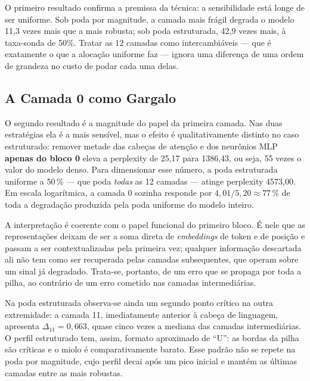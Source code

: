 \begin{figure}[htb]
\begin{tikzpicture}[scale=0.85]
\end{tikzpicture}
\end{figure}

O primeiro resultado confirma a premissa da técnica: a sensibilidade está longe de ser
uniforme. Sob poda por magnitude, a camada mais frágil degrada o modelo 11,3 vezes mais
que a mais robusta; sob poda estruturada, 42,9 vezes mais, à taxa-sonda de 50\%. Tratar as
12 camadas como intercambiáveis --- que é exatamente o que a alocação uniforme faz ---
ignora uma diferença de uma ordem de grandeza no custo de podar cada uma delas.

\subsection{A Camada 0 como Gargalo}\label{subsec:camada_zero}

O segundo resultado é a magnitude do papel da primeira camada. Nas duas
estratégias ela é a mais sensível, mas o efeito é qualitativamente distinto no
caso estruturado: remover metade das cabeças de atenção e dos neurônios MLP
\textbf{apenas do bloco 0} eleva a perplexity de 25,17 para 1386,43, ou seja,
55 vezes o valor do modelo denso. Para dimensionar esse número, a poda
estruturada uniforme a 50\,\% --- que poda \textit{todas} as 12 camadas ---
atinge perplexity 4573,00. Em escala logarítmica, a camada 0 sozinha responde
por $4{,}01/5{,}20 \approx 77\,\%$ de toda a degradação produzida pela poda
uniforme do modelo inteiro.

A interpretação é coerente com o papel funcional do primeiro bloco. É nele que
as representações deixam de ser a soma direta de \textit{embeddings} de token
e de posição e passam a ser contextualizadas pela primeira vez; qualquer
informação descartada ali não tem como ser recuperada pelas camadas
subsequentes, que operam sobre um sinal já degradado. Trata-se, portanto, de
um erro que se propaga por toda a pilha, ao contrário de um erro cometido nas
camadas intermediárias.

Na poda estruturada observa-se ainda um segundo ponto crítico na outra
extremidade: a camada 11, imediatamente anterior à cabeça de linguagem,
apresenta $\Delta_{11} = 0{,}663$, quase cinco vezes a mediana das camadas
intermediárias. O perfil estruturado tem, assim, formato aproximado de ``U'':
as bordas da pilha são críticas e o miolo é comparativamente barato. Esse
padrão não se repete na poda por magnitude, cujo perfil decai após um pico
inicial e mantém as últimas camadas entre as mais robustas.

